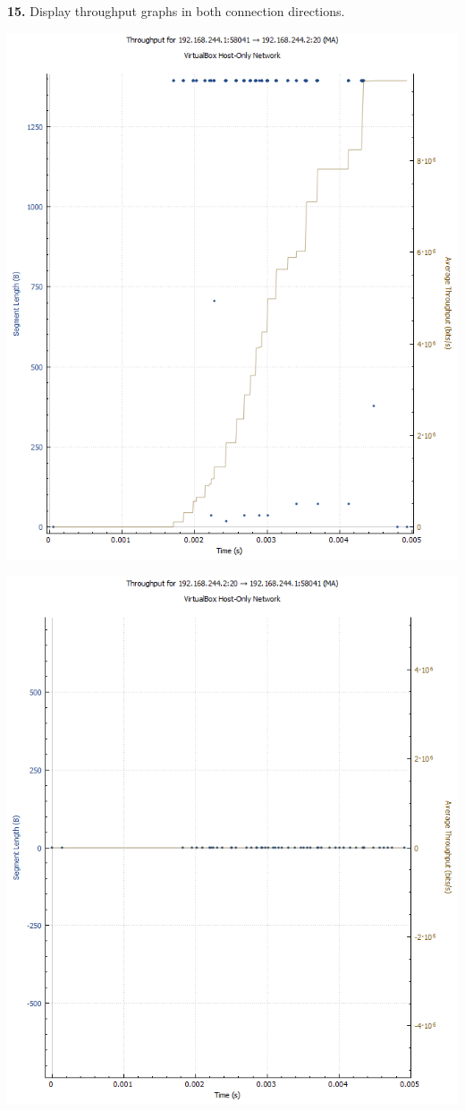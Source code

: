 \documentclass[12pt]{extarticle}
\begin{document}
\textbf{15.} Display throughput graphs in both connection directions.
\begin{center}
\includegraphics[scale=0.7]{resources/5-6-2.png}
\end{center}
\begin{center}
\includegraphics[scale=0.7]{resources/5-6-3.png}
\end{center}
\end{document}
